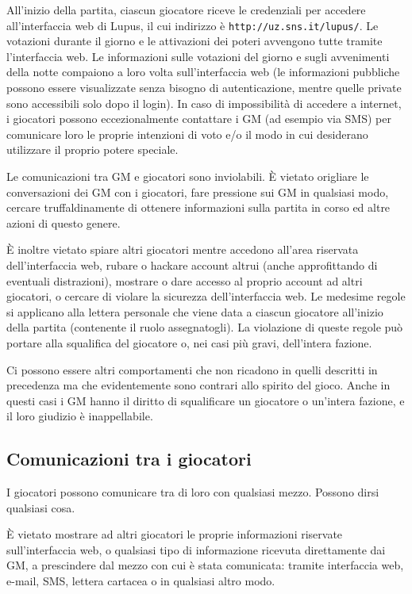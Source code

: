 \documentclass[a4paper,10pt]{article}
\begin{document}
All'inizio della partita, ciascun giocatore riceve le credenziali per accedere all'interfaccia web di Lupus, il cui indirizzo è \verb|http://uz.sns.it/lupus/|.
Le votazioni durante il giorno e le attivazioni dei poteri avvengono tutte tramite l'interfaccia web. Le informazioni sulle votazioni del giorno e sugli avvenimenti della notte compaiono a loro volta sull'interfaccia web (le informazioni pubbliche possono essere visualizzate senza bisogno di autenticazione, mentre quelle private sono accessibili solo dopo il login). In caso di impossibilità di accedere a internet, i giocatori possono eccezionalmente contattare i GM (ad esempio via SMS) per comunicare loro le proprie intenzioni di voto e/o il modo in cui desiderano utilizzare il proprio potere speciale.

Le comunicazioni tra GM e giocatori sono inviolabili. È vietato origliare le conversazioni dei GM con i giocatori, fare pressione sui GM in qualsiasi modo, cercare truffaldinamente di ottenere informazioni sulla partita in corso ed altre azioni di questo genere.

È inoltre vietato spiare altri giocatori mentre accedono all'area riservata dell'interfaccia web, rubare o hackare account altrui (anche approfittando di eventuali distrazioni), mostrare o dare accesso al proprio account ad altri giocatori, o cercare di violare la sicurezza dell'interfaccia web. Le medesime regole si applicano alla lettera personale che viene data a ciascun giocatore all'inizio della partita (contenente il ruolo assegnatogli). La violazione di queste regole può portare alla squalifica del giocatore o, nei casi più gravi, dell'intera fazione.

Ci possono essere altri comportamenti che non ricadono in quelli descritti in precedenza ma che evidentemente sono contrari allo spirito del gioco. Anche in questi casi i GM hanno il diritto di squalificare un giocatore o un'intera fazione, e il loro giudizio è inappellabile.

\subsection{Comunicazioni tra i giocatori}

I giocatori possono comunicare tra di loro con qualsiasi mezzo. Possono dirsi qualsiasi cosa.

È vietato mostrare ad altri giocatori le proprie informazioni riservate sull'interfaccia web, o qualsiasi tipo di informazione ricevuta direttamente dai GM, a prescindere dal mezzo con cui è stata comunicata: tramite interfaccia web, e-mail, SMS, lettera cartacea o in qualsiasi altro modo.
\end{document}
